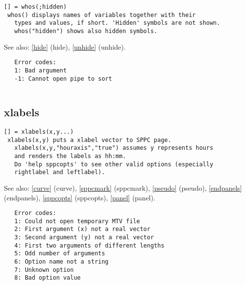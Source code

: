 \documentclass[a4paper]{article}
\begin{document}
\begin{tscreen}
\begin{verbatim}
[] = whos(;hidden)
 whos() displays names of variables together with their
   types and values, if short. 'Hidden' symbols are not shown.
   whos("hidden") shows also hidden symbols.
\end{verbatim}

See also: \ref{hide} {(hide)}, \ref{unhide} {(unhide)}.
\begin{verbatim}
   Error codes:
   1: Bad argument
   -1: Cannot open pipe to sort
   
\end{verbatim}
\end{tscreen}





\subsection{xlabels\label{xlabels}}

\begin{tscreen}
\begin{verbatim}
[] = xlabels(x,y...)
 xlabels(x,y) puts a xlabel vector to SPPC page.
   xlabels(x,y,"houraxis","true") assumes y represents hours
   and renders the labels as hh:mm.
   Do 'help sppcopts' to see other valid options (especially
   rightlabel and leftlabel).
\end{verbatim}

See also: \ref{curve} {(curve)}, \ref{sppcmark} {(sppcmark)}, \ref{pseudo} {(pseudo)}, \ref{endpanels} {(endpanels)}, \ref{sppcopts} {(sppcopts)}, \ref{panel} {(panel)}.
\begin{verbatim}
   Error codes:
   1: Could not open temporary MTV file
   2: First argument (x) not a real vector
   3: Second argument (y) not a real vector
   4: First two arguments of different lengths
   5: Odd number of arguments
   6: Option name not a string
   7: Unknown option
   8: Bad option value
\end{verbatim}
\end{tscreen}
\end{document}
